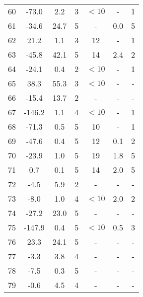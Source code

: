 \begin{longtable}{ccccccc}
60 & -73.0 & 2.2 & 3 & $<10$ & - & 1\\
61 & -34.6 & 24.7 & 5 & - & 0.0 & 5\\
62 & 21.2 & 1.1 & 3 & 12 & - & 1\\
63 & -45.8 & 42.1 & 5 & 14 & 2.4 & 2\\
64 & -24.1 & 0.4 & 2 & $<10$ & - & 1\\
65 & 38.3 & 55.3 & 3 & $<10$ & - & -\\
66 & -15.4 & 13.7 & 2 & - & - & -\\
67 & -146.2 & 1.1 & 4 & $<10$ & - & 1\\
68 & -71.3 & 0.5 & 5 & 10 & - & 1\\
69 & -47.6 & 0.4 & 5 & 12 & 0.1 & 2\\
70 & -23.9 & 1.0 & 5 & 19 & 1.8 & 5\\
71 & 0.7 & 0.1 & 5 & 14 & 2.0 & 5\\
72 & -4.5 & 5.9 & 2 & - & - & -\\
73 & -8.0 & 1.0 & 4 & $<10$ & 2.0 & 2\\
74 & -27.2 & 23.0 & 5 & - & - & -\\
75 & -147.9 & 0.4 & 5 & $<10$ & 0.5 & 3\\
76 & 23.3 & 24.1 & 5 & - & - & -\\
77 & -3.3 & 3.8 & 4 & - & - & -\\
78 & -7.5 & 0.3 & 5 & - & - & -\\
79 & -0.6 & 4.5 & 4 & - & - & -\\
\end{longtable}